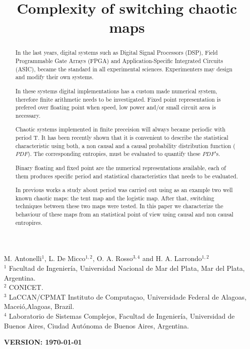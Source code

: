 \begin{frontmatter}

	\title{Complexity of switching chaotic maps}
	M. Antonelli$^{1}$, L. De Micco$^{1,2}$, O. A. Rosso$^{3,4}$ and H. A. Larrondo$^{1,2}$\\
	$^{1}$ Facultad de Ingenier\'ia, Universidad Nacional de Mar del Plata, Mar del Plata, Argentina.\\
	$^{2}$ CONICET.\\
	$^{3}$ LaCCAN/CPMAT Instituto de Computa\c{c}ao, Universidade Federal de Alagoas, Macei\'o,Alagoas, Brazil.\\
	$^{4}$ Laboratorio de Sistemas Complejos, Facultad de
	Ingenier\'ia, Universidad de Buenos Aires, Ciudad Aut\'onoma de
	Buenos Aires, Argentina.\\

\begin{abstract}
In the last years, digital systems such as Digital Signal Processors (DSP), Field Programmable Gate Arrays (FPGA) and Application-Specific Integrated Circuits (ASIC), became the standard in all experimental sciences.
Experimenters may design and modify their own systems.

In these systems digital implementations has a custom made numerical system, therefore finite arithmetic needs to be investigated.
Fixed point representation is prefered over floating point when  speed, low power and/or small circuit area is necessary.

Chaotic systems implemented in finite preceision will always became periodic with period T.
It has been recently shown that it is convenient to describe the statistical characteristic using both, a non causal and a causal probability distribution function ($PDF$).
The corresponding entropies, must be evaluated to quantify these $PDF$'s.  

Binary floating and fixed point are the numerical representations available, each of them produces specific period and statistical characteristics that needs to be evaluated.

In previous works a study about period was carried out using as an example two well known chaotic maps: the tent map and the logistic map. After that, switching techniques between these two maps were tested.
In this paper we characterize the behaviour of these maps from an statistical point of view using causal and non causal entropires.

\end{abstract}
\maketitle
\end{frontmatter}
{\bf VERSION: \today}